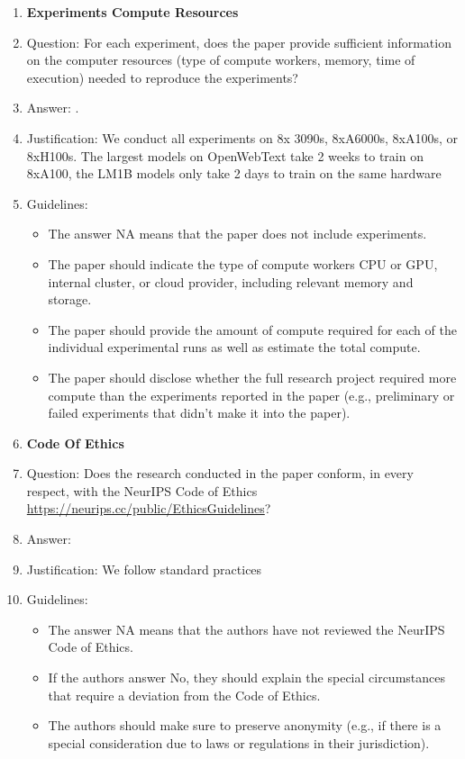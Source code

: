 \documentclass{article} %
\begin{document}
{\begin{appendices}
\begin{enumerate}
\item {\bf Experiments Compute Resources}
    \item[] Question: For each experiment, does the paper provide sufficient information on the computer resources (type of compute workers, memory, time of execution) needed to reproduce the experiments?
    \item[] Answer: 
    \answerYes{}.
    \item[] Justification: We conduct all experiments on 8x 3090s, 8xA6000s, 8xA100s, or 8xH100s. The largest models on OpenWebText take 2 weeks to train on 8xA100, the LM1B models only take 2 days to train on the same hardware %
    \item[] Guidelines:
    \begin{itemize}
        \item The answer NA means that the paper does not include experiments.
        \item The paper should indicate the type of compute workers CPU or GPU, internal cluster, or cloud provider, including relevant memory and storage.
        \item The paper should provide the amount of compute required for each of the individual experimental runs as well as estimate the total compute. 
        \item The paper should disclose whether the full research project required more compute than the experiments reported in the paper (e.g., preliminary or failed experiments that didn't make it into the paper). 
    \end{itemize}
    
\item {\bf Code Of Ethics}
    \item[] Question: Does the research conducted in the paper conform, in every respect, with the NeurIPS Code of Ethics \url{https://neurips.cc/public/EthicsGuidelines}?
    \item[] Answer: \answerYes{} %
    \item[] Justification: We follow standard practices
    \item[] Guidelines:
    \begin{itemize}
        \item The answer NA means that the authors have not reviewed the NeurIPS Code of Ethics.
        \item If the authors answer No, they should explain the special circumstances that require a deviation from the Code of Ethics.
        \item The authors should make sure to preserve anonymity (e.g., if there is a special consideration due to laws or regulations in their jurisdiction).
    \end{itemize}



\end{enumerate}
\end{appendices}}
\end{document}
